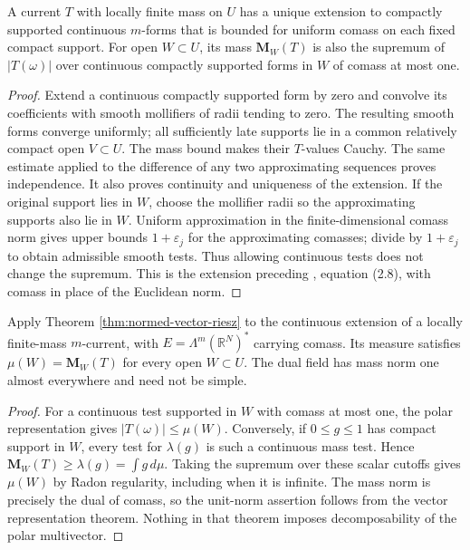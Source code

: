 \begin{lemma}\label{lem:current-continuous-extension}
A current $T$ with locally finite mass on $U$ has a unique extension to compactly supported continuous $m$-forms that is bounded for uniform comass on each fixed compact support. For open $W\subset U$, its mass $\mathbf M_W(T)$ is also the supremum of $|T(\omega)|$ over continuous compactly supported forms in $W$ of comass at most one.
\end{lemma}
\begin{proof}
Extend a continuous compactly supported form by zero and convolve its coefficients with smooth mollifiers of radii tending to zero. The resulting smooth forms converge uniformly; all sufficiently late supports lie in a common relatively compact open $V\subset U$. The mass bound makes their $T$-values Cauchy. The same estimate applied to the difference of any two approximating sequences proves independence. It also proves continuity and uniqueness of the extension. If the original support lies in $W$, choose the mollifier radii so the approximating supports also lie in $W$. Uniform approximation in the finite-dimensional comass norm gives upper bounds $1+\varepsilon_j$ for the approximating comasses; divide by $1+\varepsilon_j$ to obtain admissible smooth tests. Thus allowing continuous tests does not change the supremum. This is the extension preceding \cite{Sim18}, equation (2.8), with comass in place of the Euclidean norm.
\end{proof}

\begin{proposition}\label{prop:current-open-mass-variation}
Apply Theorem \ref{thm:normed-vector-riesz} to the continuous extension of a locally finite-mass $m$-current, with $E=\Lambda^m(\mathbb R^N)^*$ carrying comass. Its measure satisfies $\mu(W)=\mathbf M_W(T)$ for every open $W\subset U$. The dual field has mass norm one almost everywhere and need not be simple.
\end{proposition}
\begin{proof}
For a continuous test supported in $W$ with comass at most one, the polar representation gives $|T(\omega)|\leq\mu(W)$. Conversely, if $0\leq g\leq1$ has compact support in $W$, every test for $\lambda(g)$ is such a continuous mass test. Hence $\mathbf M_W(T)\geq\lambda(g)=\int g\,d\mu$. Taking the supremum over these scalar cutoffs gives $\mu(W)$ by Radon regularity, including when it is infinite. The mass norm is precisely the dual of comass, so the unit-norm assertion follows from the vector representation theorem. Nothing in that theorem imposes decomposability of the polar multivector.
\end{proof}
